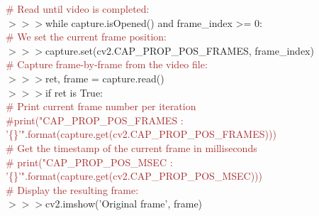 \documentclass[a4paper,18pt]{article}
\begin{document}
{{{{{{{\textcolor{brown}{\# Read until video is completed:}\\
\hspace*{14pt}$>>>$while capture.isOpened() and frame\_index >= 0:\\

{\textcolor{brown}{\# We set the current frame position:}\\
\hspace*{14pt}$>>>$\hspace*{28pt}capture.set(cv2.CAP\_PROP\_POS\_FRAMES, frame\_index)\\

{\textcolor{brown}{\# Capture frame-by-frame from the video file:}\\
\hspace*{14pt}$>>>$\hspace*{28pt}ret, frame = capture.read()\\

\hspace*{14pt}$>>>$\hspace*{28pt}if ret is True:\\

{\textcolor{brown}{\# Print current frame number per iteration}\\ {\textcolor{brown}{\#print("CAP\_PROP\_POS\_FRAMES : '\{\}'".format(capture.get(cv2.CAP\_PROP\_POS\_FRAMES)))}\\

{\textcolor{brown}{\# Get the timestamp of the current frame in milliseconds}\\
{\textcolor{brown}{\# print("CAP\_PROP\_POS\_MSEC : '\{\}'".format(capture.get(cv2.CAP\_PROP\_POS\_MSEC)))}\\

{\textcolor{brown}{\# Display the resulting frame:}\\
\hspace*{14pt}$>>>$\hspace*{42pt}cv2.imshow('Original frame', frame)\\

}}}}}}}}}}}}}}
\end{document}
